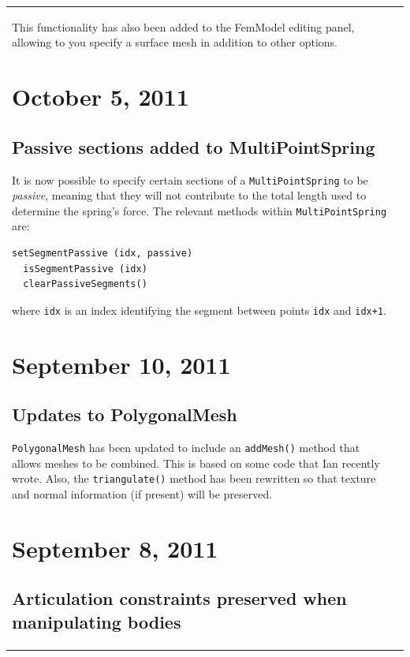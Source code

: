 \documentclass{article}
\begin{document}
\begin{tabular}{ll}
This functionality has also been added to the FemModel editing panel,
allowing to you specify a surface mesh in addition to other options.

\section*{October 5, 2011}

\subsection*{Passive sections added to MultiPointSpring}

It is now possible to specify certain sections of a {\tt MultiPointSpring}
to be {\it passive}, meaning that they will not contribute to the total
length used to determine the spring's force. The relevant
methods within {\tt MultiPointSpring} are:

\begin{lstlisting}[]
  setSegmentPassive (idx, passive)
  isSegmentPassive (idx)
  clearPassiveSegments()
\end{lstlisting}

where {\tt idx} is an index identifying the segment between points
{\tt idx} and {\tt idx+1}.

\section*{September 10, 2011}

\subsection*{Updates to PolygonalMesh}

{\tt PolygonalMesh} has been updated to include an {\tt addMesh()} method that
allows meshes to be combined. This is based on some code that Ian
recently wrote. Also, the {\tt triangulate()} method has been rewritten so
that texture and normal information (if present) will be preserved.

\section*{September 8, 2011}

\subsection*{Articulation constraints preserved when manipulating bodies}


\end{tabular}
\end{document}
